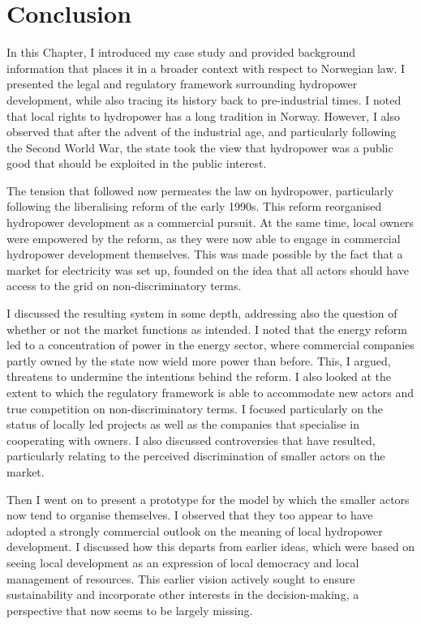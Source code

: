 \section{Conclusion}\label{sec:conc3}

In this Chapter, I introduced my case study and provided background information that places it in a broader context with respect to Norwegian law. I presented the legal and regulatory framework surrounding hydropower development, while also tracing its history back to pre-industrial times. I noted that local rights to hydropower has a long tradition in Norway. However, I also observed that after the advent of the industrial age, and particularly following the Second World War, the state took the view that hydropower was a public good that should be exploited in the public interest.

The tension that followed now permeates the law on hydropower, particularly following the liberalising reform of the early 1990s. This reform reorganised hydropower development as a commercial pursuit. At the same time, local owners were empowered by the reform, as they were now able to engage in commercial hydropower development themselves. This was made possible by the fact that a market for electricity was set up, founded on the idea that all actors should have access to the grid on non-discriminatory terms. 

I discussed the resulting system in some depth, addressing also the question of whether or not the market functions as intended. I noted that the energy reform led to a concentration of power in the energy sector, where commercial companies partly owned by the state now wield more power than before. This, I argued, threatens to undermine the intentions behind the reform. I also looked at the extent to which the regulatory framework is able to accommodate new actors and true competition on non-discriminatory terms. I focused particularly on the status of locally led projects as well as the companies that specialise in cooperating with owners. I also discussed controversies that have resulted, particularly relating to the perceived discrimination of smaller actors on the market.

Then I went on to present a prototype for the model by which the smaller actors now tend to organise themselves. I observed that they too appear to have adopted a strongly commercial outlook on the meaning of local hydropower development. I discussed how this departs from earlier ideas, which were based on seeing local development as an expression of local democracy and local management of resources. This earlier vision actively sought to ensure sustainability and incorporate other interests in the decision-making, a perspective that now seems to be largely missing.

